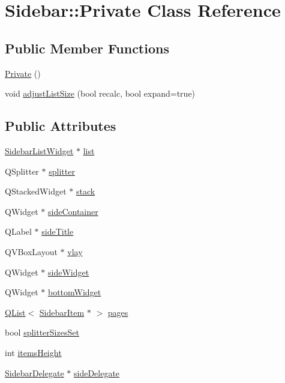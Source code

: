 \hypertarget{classSidebar_1_1Private}{\section{Sidebar\+:\+:Private Class Reference}
\label{classSidebar_1_1Private}
}
\subsection*{Public Member Functions}
\begin{DoxyCompactItemize}
\item 
\hyperlink{classSidebar_1_1Private_ac1af202e142000d02c7c00122e0483fe}{Private} ()
\item 
void \hyperlink{classSidebar_1_1Private_a65d6c77ebd73135cc391a85e2732cbfa}{adjust\+List\+Size} (bool recalc, bool expand=true)
\end{DoxyCompactItemize}
\subsection*{Public Attributes}
\begin{DoxyCompactItemize}
\item 
\hyperlink{classSidebarListWidget}{Sidebar\+List\+Widget} $\ast$ \hyperlink{classSidebar_1_1Private_a0b3cabc80bb0d0d9259723cbe786908e}{list}
\item 
Q\+Splitter $\ast$ \hyperlink{classSidebar_1_1Private_acbf19dbc3945da830d814331d5fc9a26}{splitter}
\item 
Q\+Stacked\+Widget $\ast$ \hyperlink{classSidebar_1_1Private_abe83197f943319864ba227501d81cd04}{stack}
\item 
Q\+Widget $\ast$ \hyperlink{classSidebar_1_1Private_a2a3136a30630243128369d98c44b1823}{side\+Container}
\item 
Q\+Label $\ast$ \hyperlink{classSidebar_1_1Private_a37b19515edf372e8581845c398549122}{side\+Title}
\item 
Q\+V\+Box\+Layout $\ast$ \hyperlink{classSidebar_1_1Private_a5c6712e42bbf4615df9c2366dd7fa073}{vlay}
\item 
Q\+Widget $\ast$ \hyperlink{classSidebar_1_1Private_af2a5ad9bec19e907938f6eff1ade3ad9}{side\+Widget}
\item 
Q\+Widget $\ast$ \hyperlink{classSidebar_1_1Private_a4ba08960dff0b43cb43421a2ad171163}{bottom\+Widget}
\item 
\hyperlink{classQList}{Q\+List}$<$ \hyperlink{classSidebarItem}{Sidebar\+Item} $\ast$ $>$ \hyperlink{classSidebar_1_1Private_a4433064c6850086bce54e0ce62dc8885}{pages}
\item 
bool \hyperlink{classSidebar_1_1Private_a99a16d70b6092f5ae63c2b349006beb0}{splitter\+Sizes\+Set}
\item 
int \hyperlink{classSidebar_1_1Private_a467a6317bcfa987166b354f2145e1dbb}{items\+Height}
\item 
\hyperlink{classSidebarDelegate}{Sidebar\+Delegate} $\ast$ \hyperlink{classSidebar_1_1Private_a25b75ddd6cbb379f77f71207ad627d54}{side\+Delegate}
\end{DoxyCompactItemize}


